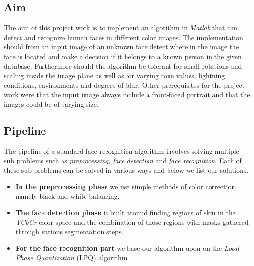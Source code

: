 \subsection{Aim}
The aim of this project work is to implement an algorithm in \textit{Matlab} that can detect and recognize human faces in different color images. The implementation should from an input image of an unknown face detect where in the image the face is located and make a decision if it belongs to a known person in the given database. Furthermore should the algorithm be tolerant for small rotations and scaling inside the image plane as well as for varying tone values, lightning conditions, environments and degrees of blur. Other prerequisites for the project work were that the input image always include a front-faced portrait and that the images could be of varying size.

\subsection{Pipeline}
The pipeline of a standard face recognition algorithm involves solving multiple sub problems such as \textit{preprocessing}, \textit{face detection} and \textit{face recognition}. Each of these sub problems can be solved in various ways and below we list our solutions.

\begin{itemize}
  \item \textbf{In the preprocessing phase} we use simple methods of color correction, namely black and white balancing. 
  \item \textbf{The face detection phase} is built around finding regions of skin in the \textit{YCbCr} color space and the combination of those regions with masks gathered through various segmentation steps. 
  \item \textbf{For the face recognition part} we base our algorithm upon on the \textit{Local Phase Quantization} (LPQ) algorithm. 

\end{itemize}
